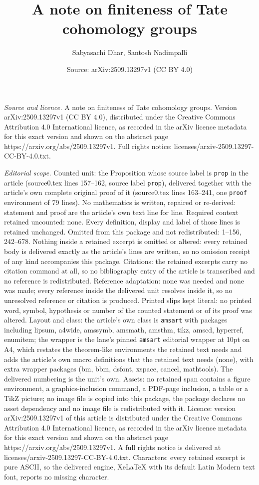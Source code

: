 \documentclass[10pt,a4paper]{amsart}
\title[A note on finiteness of Tate cohomology groups]{A note on finiteness of Tate cohomology groups}
\author{Sabyasachi Dhar, Santosh Nadimpalli}
\date{Source: arXiv:2509.13297v1 (CC BY 4.0)}
\begin{document}
\maketitle

\noindent\emph{Source and licence.} A note on finiteness of Tate cohomology groups. Version arXiv:2509.13297v1 (CC BY 4.0), distributed under the Creative Commons Attribution 4.0 International licence, as recorded in the arXiv licence metadata for this exact version and shown on the abstract page https://arxiv.org/abs/2509.13297v1. Full rights notice: licenses/arxiv-2509.13297-CC-BY-4.0.txt.\par\smallskip

\noindent\textit{Editorial scope.} Counted unit: the Proposition whose source label is \texttt{prop} in the article (source0.tex lines 157--162, source label \texttt{prop}), delivered together with the article's own complete original proof of it (source0.tex lines 163--241, one \texttt{proof} environment of 79 lines). No mathematics is written, repaired or re-derived: statement and proof are the article's own text line for line. Required context retained uncounted: none. Every definition, display and label of those lines is retained unchanged. Omitted from this package and not redistributed: 1--156, 242--678. Nothing inside a retained excerpt is omitted or altered: every retained body is delivered exactly as the article's lines are written, so no omission receipt of any kind accompanies this package. Citations: the retained excerpts carry no citation command at all, so no bibliography entry of the article is transcribed and no reference is redistributed. Reference adaptation: none was needed and none was made; every reference inside the delivered unit resolves inside it, so no unresolved reference or citation is produced. Printed slips kept literal: no printed word, symbol, hypothesis or number of the counted statement or of its proof was altered. Layout and class: the article's own class is \texttt{amsart} with packages including lipsum, a4wide, amssymb, amsmath, amsthm, tikz, amscd, hyperref, enumitem; the wrapper is the lane's pinned \texttt{amsart} editorial wrapper at 10pt on A4, which restates the theorem-like environments the retained text needs and adds the article's own macro definitions that the retained text needs (none), with extra wrapper packages (bm, bbm, dsfont, xspace, cancel, mathtools). The delivered numbering is the unit's own. Assets: no retained span contains a figure environment, a graphics-inclusion command, a PDF-page inclusion, a table or a TikZ picture; no image file is copied into this package, the package declares no asset dependency and no image file is redistributed with it. Licence: version arXiv:2509.13297v1 of this article is distributed under the Creative Commons Attribution 4.0 International licence, as recorded in the arXiv licence metadata for this exact version and shown on the abstract page https://arxiv.org/abs/2509.13297v1. A full rights notice is delivered at licenses/arxiv-2509.13297-CC-BY-4.0.txt. Characters: every retained excerpt is pure ASCII, so the delivered engine, XeLaTeX with its default Latin Modern text font, reports no missing character.
\end{document}
